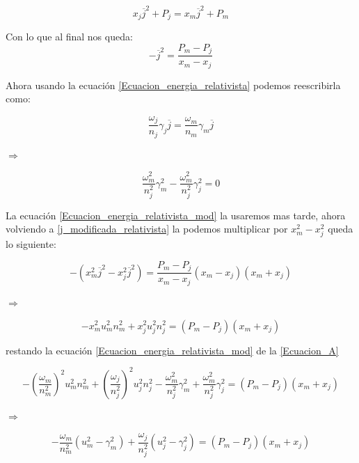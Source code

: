 \documentclass[12pt,a4paper]{book}
\begin{document}
\begin{equation}
x_{j} \overline{j}^{2}+P_{j}
= 
x_{m} \overline{j}^{2}+P_{m}
\end{equation}

Con lo que al final nos queda:
\begin{equation} \label{j_modificada_relativista}
-\overline{j}^{2}=\frac{P_{m}-P_{j}}{x_{m}-x_{j}}
\end{equation}

Ahora usando la ecuación \ref{Ecuacion_energia_relativista}
podemos reescribirla como:

\begin{equation*}
\frac{\omega_j}{n_j}\gamma_j \overline{j}= \frac{\omega_m}{n_m}\gamma_m \overline{j}
\end{equation*}

$\Rightarrow$

\begin{equation} \label{Ecuacion_energia_relativista_mod}
\frac{\omega_m^2}{n_j^2}\gamma_m^2- \frac{\omega_m^2}{n_j^2}\gamma_j^2= 0
\end{equation}

La ecuación \ref{Ecuacion_energia_relativista_mod} la usaremos mas tarde, ahora volviendo a \ref{j_modificada_relativista} la podemos multiplicar por  $x_m^2-x_j^2$ queda lo siguiente:

\begin{equation*}
- \left( x_m^2 \overline{j}^{2}-x_j^2 \overline{j}^{2} \right) =
\frac{P_m-P_j}{x_m-x_j} \left( x_m-x_j \right) \left( x_m+x_j \right)
\end{equation*}

$\Rightarrow$

\begin{equation} \label{Ecuacion_A}
-x_m^2 u_m^2 n_m^2 + x_j^2 u_j^2 n_j^2 =
\left( P_m-P_j \right) \left( x_m+x_j \right) 
\end{equation}

restando la ecuación \ref{Ecuacion_energia_relativista_mod} de la \ref{Ecuacion_A}

\begin{equation}
-\left( \frac{\omega_{m}}{n_m^2}\right)^2 u_m^2 n_m^2 +
\left( \frac{\omega_{j}}{n_j^2}\right)^2 u_j^2 n_j^2 -
\frac{\omega_m^2}{n_j^2}\gamma_m^2 +
\frac{\omega_m^2}{n_j^2}\gamma_j^2
=
\left( P_m-P_j \right) \left( x_m+x_j \right) 
\end{equation}

$\Rightarrow$

\begin{equation} \label{ec_mod_beta-lor}
-\frac{\omega_{m}}{n_m^2} \left( u_m^2-\gamma_m^2 \right)
+\frac{\omega_{j}}{n_j^2} \left( u_j^2-\gamma_j^2 \right)
=\left( P_m-P_j \right) \left( x_m+x_j \right) 
\end{equation}
\end{document}
